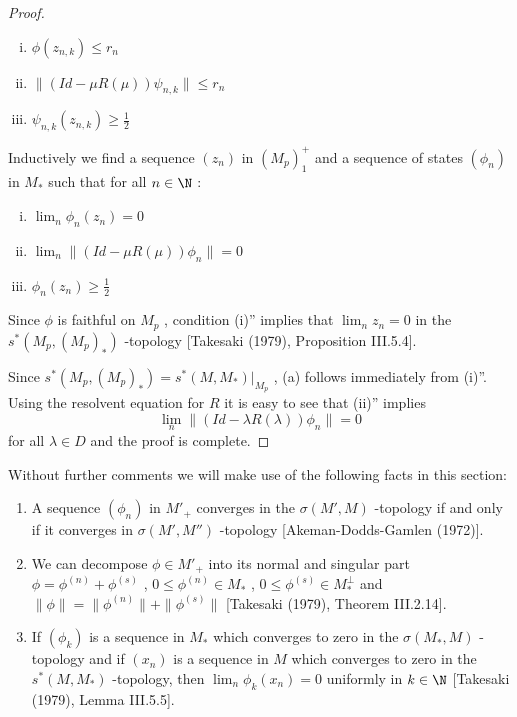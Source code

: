 \begin{proof}
\begin{enumerate}[(i)']
\item
$ \phi(z_{n,k}) \leq r_{n} $ 

\item
$ \|(Id - \mu R(\mu))\psi_{n,k}\| \leq r_{n} $ 

\item
$ \psi_{n,k}(z_{n,k}) \geq \frac{1}{2} $ 
\end{enumerate}

Inductively we find a sequence $ (z_{n}) $  in $ (M_{p})_{1}^{+} $  and a sequence of states $ (\phi_{n}) $  in $ M_{*} $  such that for all $ n \in \N $ :

\begin{enumerate}[(i)'']
\item
$ \lim_{n} \phi_{n}(z_{n}) = 0 $ 

\item
$ \lim_{n} \|(Id - \mu R(\mu))\phi_{n}\| = 0 $ 

\item
$ \phi_{n}(z_{n}) \geq \frac{1}{2} $ 
\end{enumerate}

Since $ \phi $  is faithful on $ M_{p} $ , condition (i)'' implies that $ \lim_{n} z_{n} = 0 $  in the $ s^{*}(M_{p},(M_{p})_{*}) $ -topology [Takesaki (1979), Proposition III.5.4].

\newpage

Since $ s^{*}(M_{p},(M_{p})_{*}) = s^{*}(M,M_{*})|_{M_{p}} $ , (a) follows immediately from (i)''.
Using the resolvent equation for $ R $  it is easy to see that (ii)'' implies
\[
\lim_{n} \|(Id - \lambda R(\lambda))\phi_{n}\| = 0
\]
for all $ \lambda \in D $  and the proof is complete.
\end{proof}

Without further comments we will make use of the following facts in this section:

\begin{enumerate}[(1)]
\item
A sequence $ (\phi_{n}) $  in $ M'_{+} $  converges in the $ \sigma(M',M) $ -topology if and only if it converges in $ \sigma(M',M'') $ -topology [Akeman-Dodds-Gamlen (1972)].

\item
We can decompose $ \phi \in M'_{+} $  into its normal and singular part $ \phi = \phi^{(n)} + \phi^{(s)} $ , $ 0 \leq \phi^{(n)} \in M_{*} $ , $ 0 \leq \phi^{(s)} \in M_*^{\perp} $  and $ \|\phi\| = \|\phi^{(n)}\| + \|\phi^{(s)}\| $  [Takesaki (1979), Theorem III.2.14].

\item
If $ (\phi_{k}) $  is a sequence in $ M_{*} $  which converges to zero in the $ \sigma(M_{*},M) $ -topology and if $ (x_{n}) $  is a sequence in $ M $  which converges to zero in the $ s^{*}(M,M_{*}) $ -topology, then $ \lim_{n} \phi_{k}(x_{n}) = 0 $  uniformly in $ k \in \N $  [Takesaki (1979), Lemma III.5.5].
\end{enumerate}

